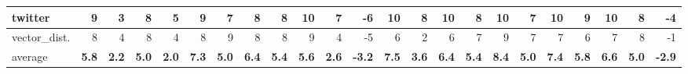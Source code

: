 \begin{table}[!h]
{\begin{tabular}{|p{2.9cm}|rr|rr|rr|rr|rr|r||rr|rr|rr|rr|rr|r|}
			twitter                & \cellcolor[HTML]{79B161}9            & {\cellcolor[HTML]{D3E5CB}3}            & \cellcolor[HTML]{88BA73}8            & {\cellcolor[HTML]{B5D4A7}5}            & \cellcolor[HTML]{79B161}9            & {\cellcolor[HTML]{97C384}7}            & \cellcolor[HTML]{88BA73}8            & {\cellcolor[HTML]{88BA73}8}            & \cellcolor[HTML]{6AA84F}10           & {\cellcolor[HTML]{97C384}7}            & \cellcolor[HTML]{FFC166}-6            & \cellcolor[HTML]{6AA84F}10           & {\cellcolor[HTML]{88BA73}8}            & \cellcolor[HTML]{6AA84F}10           & {\cellcolor[HTML]{88BA73}8}            & \cellcolor[HTML]{6AA84F}10           & {\cellcolor[HTML]{97C384}7}            & \cellcolor[HTML]{6AA84F}10           & {\cellcolor[HTML]{79B161}9}            & \cellcolor[HTML]{6AA84F}10           & {\cellcolor[HTML]{88BA73}8}            & \cellcolor[HTML]{C79349}-4            \\ \hline
			vector\_dist.          & \cellcolor[HTML]{88BA73}8            & {\cellcolor[HTML]{C4DDB9}4}            & \cellcolor[HTML]{88BA73}8            & {\cellcolor[HTML]{C4DDB9}4}            & \cellcolor[HTML]{88BA73}8            & {\cellcolor[HTML]{79B161}9}            & \cellcolor[HTML]{88BA73}8            & {\cellcolor[HTML]{88BA73}8}            & \cellcolor[HTML]{79B161}9            & {\cellcolor[HTML]{C4DDB9}4}            & \cellcolor[HTML]{FFCC7F}-5            & \cellcolor[HTML]{A6CB96}6            & {\cellcolor[HTML]{E2EEDC}2}            & \cellcolor[HTML]{A6CB96}6            & {\cellcolor[HTML]{97C384}7}            & \cellcolor[HTML]{79B161}9            & {\cellcolor[HTML]{97C384}7}            & \cellcolor[HTML]{97C384}7            & {\cellcolor[HTML]{A6CB96}6}            & \cellcolor[HTML]{97C384}7            & {\cellcolor[HTML]{88BA73}8}            & \cellcolor[HTML]{AB906D}-1            \\ \hline
			average                & \cellcolor[HTML]{AACD9A}\textbf{5.8} & {\cellcolor[HTML]{DEECD8}\textbf{2.2}} & \cellcolor[HTML]{B4D4A7}\textbf{5.0} & {\cellcolor[HTML]{E2EEDD}\textbf{2.0}} & \cellcolor[HTML]{93C07F}\textbf{7.3} & {\cellcolor[HTML]{B5D4A7}\textbf{5.0}} & \cellcolor[HTML]{A1C890}\textbf{6.4} & {\cellcolor[HTML]{B0D1A1}\textbf{5.4}} & \cellcolor[HTML]{ACCF9D}\textbf{5.6} & {\cellcolor[HTML]{D8E9D1}\textbf{2.6}} & \cellcolor[HTML]{FFDDAC}\textbf{-3.2} & \cellcolor[HTML]{8FBE7B}\textbf{7.5} & {\cellcolor[HTML]{CAE1C1}\textbf{3.6}} & \cellcolor[HTML]{A0C88F}\textbf{6.4} & {\cellcolor[HTML]{AED0A0}\textbf{5.4}} & \cellcolor[HTML]{82B66C}\textbf{8.4} & {\cellcolor[HTML]{B6D4A8}\textbf{5.0}} & \cellcolor[HTML]{92BF7E}\textbf{7.4} & {\cellcolor[HTML]{A9CD99}\textbf{5.8}} & \cellcolor[HTML]{9DC68B}\textbf{6.6} & {\cellcolor[HTML]{B4D4A7}\textbf{5.0}} & \cellcolor[HTML]{BD9256}\textbf{-2.9} \\ \hline

\end{tabular}}
\end{table}
